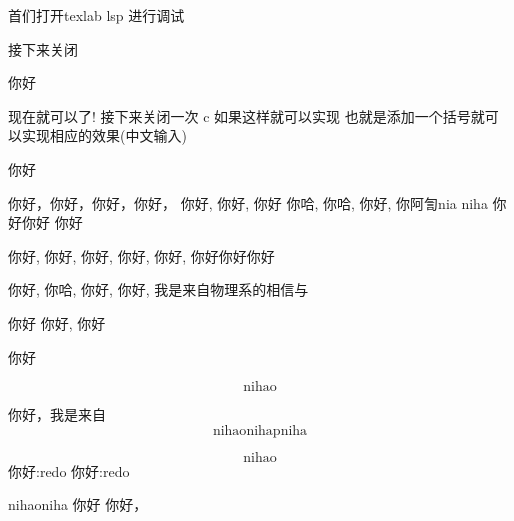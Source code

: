 首们打开texlab lsp 进行调试

接下来关闭

你好
\begin{figure}
\end{figure}

现在就可以了!
接下来关闭一次
c
如果这样就可以实现
 也就是添加一个括号就可以实现相应的效果(中文输入)

你好


你好，你好，你好，你好，
你好, 你好, 你好
你哈, 你哈, 你好, 你阿訇nia
niha 你好你好 你好

你好, 你好, 你好, 你好, 你好, 你好你好你好

你好, 你哈, 你好, 你好, 我是来自物理系的相信与

你好 你好, 你好

你好

\begin{equation}
	\text{nihao}
\end{equation}

你好，我是来自
\begin{equation}
	\text{nihao}
	\text{nihap}
	\text{niha}
\end{equation}

\begin{equation}
	\text{nihao}
\end{equation}
你好:redo
你好:redo

nihaoniha
你好
你好，
